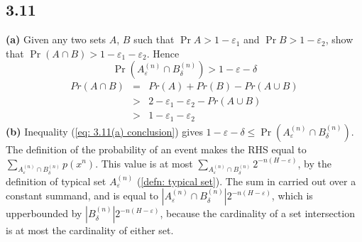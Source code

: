 \documentclass[10pt]{article}
\newcommand{\pref}[1]{{(\ref{#1})}}
\begin{document}
\begin{scriptsize}
\begin{multicols}{3}
\section*{3.11}
\textbf{(a)}
Given any two sets $A$, $B$ such that $\Pr{A} > 1-\varepsilon_1$ and
$\Pr{B} > 1-\varepsilon_2$, show that $\Pr(A\cap B) > 1 - \varepsilon_1 -
\varepsilon_2$. Hence
\begin{equation}
    \Pr(A_\varepsilon^{(n)} \cap B_\delta^{(n)}) > 1 - \varepsilon - \delta
    \label{eq: 3.11(a) conclusion}
\end{equation}
\proof
\begin{eqnarray}
    Pr(A\cap B) &=& Pr(A) + Pr(B) - Pr(A\cup B)
    \label{eq: pr A intersect B} \\
    &>& 2 - \varepsilon_1 - \varepsilon_2 - Pr(A\cup B)
    \label{eq: sub hypotheses} \\
    &>& 1 - \varepsilon_1 - \varepsilon_2
    \label{eq: 3.11a}
\end{eqnarray}
\textbf{(b)} 
Inequality \pref{eq: 3.11(a) conclusion} gives $1-\varepsilon-\delta \leq \Pr(A_\varepsilon^{(n)} \cap B_\delta^{(n)})$. 
The definition of the probability of an event makes the RHS equal to
$\sum_{A_\varepsilon^{(n)} \cap B_\delta^{(n)}} p(x^n)$.
This value is at most 
$\sum_{A_\varepsilon^{(n)} \cap B_\delta^{(n)}} 2^{-n(H-\varepsilon)}$, 
by the definition of typical set $A_\varepsilon^{(n)}$ \pref{defn: typical set}.
The sum in carried out over a constant summand, and is equal to
$|A_\varepsilon^{(n)} \cap B_\delta^{(n)}|2^{-n(H-\varepsilon)}$, which is
upperbounded by $|B_\delta^{(n)}|2^{-n(H-\varepsilon)}$, because the
cardinality of a set intersection is at most the cardinality of either
set.

\end{multicols}
\end{scriptsize}
\end{document}
